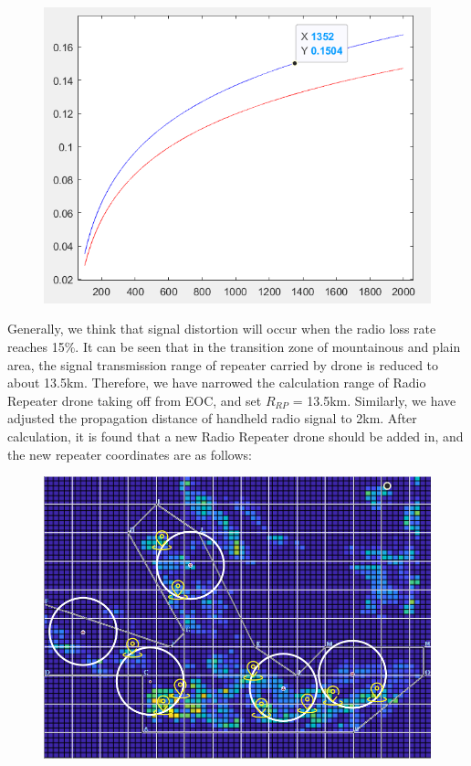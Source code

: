 \documentclass{mcmthesis}
\begin{document}
\begin{figure}[H]
  \centering
  \includegraphics[scale=0.4]{image/G.png}
  
\end{figure}
Generally, we think that signal distortion will occur when the radio loss rate reaches 15\%. It can be seen that in the transition zone of mountainous and plain area, the signal transmission range of repeater carried by drone is reduced to about 13.5km. Therefore, we have narrowed the calculation range of Radio Repeater drone taking off from EOC, and set $R_{RP}$ = 13.5km. Similarly, we have adjusted the propagation distance of handheld radio signal to 2km. After calculation, it is found that a new Radio Repeater drone should be added in, and the new repeater coordinates are as follows:

\begin{figure}[H]
  \centering
  \includegraphics[scale=0.4]{image/H.png}
  
\end{figure}
\end{document}
